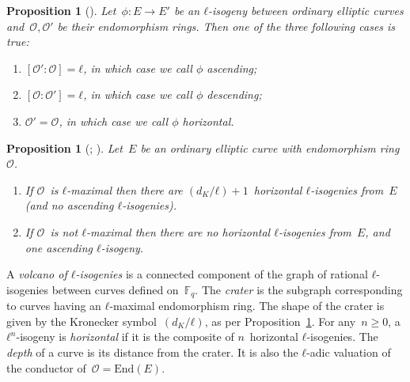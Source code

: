 \documentclass{lms}
\newtheorem{prop}[thm]{Proposition}
\begin{document}
\begin{prop}[{\cite[Proposition~21]{Kohel}}] \label{prop:isogeny-asc-desc}
Let~$ϕ: E → E'$ be an $ℓ$-isogeny between ordinary elliptic curves
and~$\mathcal O, \mathcal O'$ be their endomorphism rings.
Then one of the three following cases is true:
\begin{enumerate}
\item $[\mathcal O':\mathcal O] = ℓ$,
in which case we call $ϕ$ \emph{ascending};
\item $[\mathcal O:\mathcal O'] = ℓ$,
in which case we call $ϕ$ \emph{descending};
\item $\mathcal O' = \mathcal O$,
in which case we call $ϕ$ \emph{horizontal}.
\end{enumerate}
\end{prop}
\begin{prop}[{\cite[Proposition~23]{Kohel}; \cite[Lemma~6]{sutherland2013isogeny}}] \label{prop:isogeny-count}
Let~$E$ be an ordinary elliptic curve with endomorphism ring~$\mathcal O$.
\begin{enumerate}
\item If $\mathcal O$~is $ℓ$-maximal then
there are $(d_K/ℓ)+1$~horizontal $ℓ$-isogenies from~$E$
(and no ascending $ℓ$-isogenies).
\item If $\mathcal O$~is not $ℓ$-maximal then
there are no horizontal $ℓ$-isogenies from~$E$,
and one ascending $ℓ$-isogeny.
\end{enumerate}
\end{prop}

A \emph{volcano of $ℓ$-isogenies} is a connected component
of the graph of rational $ℓ$-isogenies between curves defined on~$\mathbb F_q$.
The \emph{crater} is the subgraph corresponding to curves
having an $ℓ$-maximal endomorphism ring.
The shape of the crater is given by the Kronecker symbol~$(d_K/ℓ)$,
as per Proposition~\ref{prop:isogeny-count}.
For any~$n ≥ 0$, a $ℓ^n$-isogeny is \emph{horizontal}
if it is the composite of $n$~horizontal $ℓ$-isogenies.
The \emph{depth} of a curve is its distance from the crater.
It is also the $ℓ$-adic valuation of the conductor
of~$\mathcal O = \mathrm{End}(E)$.
\end{document}
